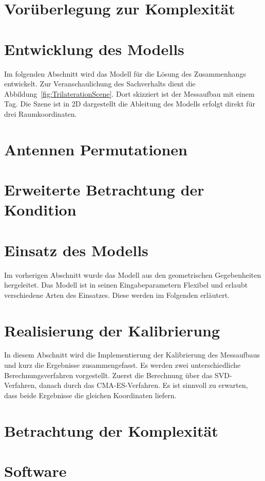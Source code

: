 \section{Vorüberlegung zur Komplexität}
\label{sec:Komplexity1}

%
\section{Entwicklung des Modells}
\label{sec:model_developement}
Im folgenden Abschnitt wird das Modell für die Lösung des Zusammenhangs entwickelt. Zur Veranschaulichung des Sachverhalts dient die Abbildung~\ref{fig:TrilaterationScene}. Dort skizziert ist der Messaufbau mit einem Tag. Die Szene ist in 2D dargestellt die Ableitung des Modells erfolgt direkt für drei Raumkoordinaten.
%

%
\section{Antennen Permutationen}

%
\section{Erweiterte Betrachtung der Kondition}

%
\section{Einsatz des Modells}
\label{sec:use_of_model}
Im vorherigen Abschnitt wurde das Modell aus den geometrischen Gegebenheiten hergeleitet. Das Modell ist in seinen Eingabeparametern Flexibel und erlaubt verschiedene Arten des Einsatzes. Diese werden im Folgenden erläutert.
%

%
\section{Realisierung der Kalibrierung}
\label{sec:calibration}
In diesem Abschnitt wird die Implementierung der Kalibrierung des Messaufbaus und kurz die Ergebnisse zusammengefasst. Es werden zwei unterschiedliche Berechnungsverfahren vorgestellt. Zuerst die Berechnung über das SVD-Verfahren, danach durch das CMA-ES-Verfahren. Es ist sinnvoll zu erwarten, dass beide Ergebnisse die gleichen Koordinaten liefern.
%

%
\section{Betrachtung der Komplexität}
\label{sec:Komplexity2}


\section{Software}
\label{sec:sw}

\lipsum[1-3]


